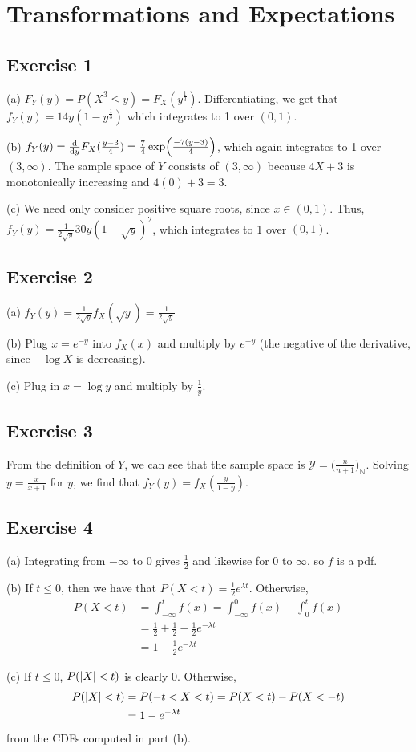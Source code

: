\section{Transformations and Expectations}

\subsection{Exercise 1}
(a) $F_Y(y) = P(X^3 \leq y) = F_X (y^{\frac{1}{3}})$. Differentiating, we get that 
$f_Y(y) = 14y(1 - y^{\frac{1}{3}})$ which integrates to 1 over $(0, 1)$.

(b)  $f_Y(y) = \dv{y} F_X(\frac{y - 3}{4}) = \frac{7}{4} \exp(\frac{-7(y - 3)}{4})$, which again
integrates to 1 over $(3, \infty)$. The sample space of $Y$ consists of $(3, \infty)$ because 
$4X + 3$ is monotonically increasing and $4(0) + 3 = 3$.

(c) We need only consider positive square roots, since  $x \in (0, 1)$. Thus,
$f_Y(y) = \frac{1}{2\sqrt{y}}30y (1 - \sqrt{y})^2$, which integrates to 1 over $(0, 1)$.

\subsection{Exercise 2}
(a) $f_Y(y) = \frac{1}{2\sqrt{y}} f_X(\sqrt{y}) = \frac{1}{2\sqrt{y}}$

(b) Plug $x = e^{-y}$ into $f_X(x)$ and multiply by $e^{-y}$ (the negative of the derivative, since $-\log X$
is decreasing).

(c) Plug in  $x = \log y$ and multiply by $\frac{1}{y}$.

\subsection{Exercise 3}
From the definition of $Y$, we can see that the sample space is
$\mathcal{Y} = \big(\frac{n}{n+1}\big)_{\mathbb{N}}$. Solving $y = \frac{x}{x + 1}$ for $y$, we find that
$f_Y(y) = f_X(\frac{y}{1 - y})$.

\subsection{Exercise 4}
(a) Integrating from $-\infty$ to 0 gives $\frac{1}{2}$ and likewise for 0 to  $\infty$, so $f$ is a pdf.

(b) If $t \leq 0$, then we have that $P(X < t) = \frac{1}{2} e^{\lambda t}$. Otherwise, 
\begin{align*}
        P(X < t) &= \int_{-\infty}^{t} f(x) = \int_{-\infty}^{0} f(x) + \int_{0}^{t} f(x) \\ 
                 &= \frac{1}{2} + \frac{1}{2} - \frac{1}{2} e^{-\lambda t} \\
                 &= 1 - \frac{1}{2}e^{-\lambda t}
\end{align*}

(c) If $t \leq 0$, $P(\abs{X} < t)$ is clearly 0. Otherwise,
\begin{align*}
        P(\abs{X} < t) &= P(-t < X < t) = P(X < t) - P(X < -t) \\
                       &= 1 - e^{- \lambda t} 
\end{align*}
from the CDFs computed in part (b). 

